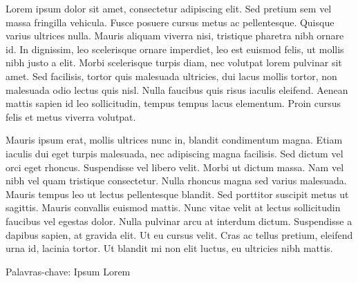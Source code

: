 
Lorem ipsum dolor sit amet, consectetur adipiscing elit. Sed pretium
sem vel massa fringilla vehicula. Fusce posuere cursus metus ac
pellentesque. Quisque varius ultrices nulla. Mauris aliquam viverra
nisi, tristique pharetra nibh ornare id. In dignissim, leo scelerisque
ornare imperdiet, leo est euismod felis, ut mollis nibh justo a elit.
Morbi scelerisque turpis diam, nec volutpat lorem pulvinar sit amet.
Sed facilisis, tortor quis malesuada ultricies, dui lacus mollis
tortor, non malesuada odio lectus quis nisl. Nulla faucibus quis risus
iaculis eleifend. Aenean mattis sapien id leo sollicitudin, tempus
tempus lacus elementum. Proin cursus felis et metus viverra volutpat.

Mauris ipsum erat, mollis ultrices nunc in, blandit condimentum magna.
Etiam iaculis dui eget turpis malesuada, nec adipiscing magna
facilisis. Sed dictum vel orci eget rhoncus. Suspendisse vel libero
velit. Morbi ut dictum massa. Nam vel nibh vel quam tristique
consectetur. Nulla rhoncus magna sed varius malesuada. Mauris tempus
leo ut lectus pellentesque blandit. Sed porttitor suscipit metus ut
sagittis. Mauris convallis euismod mattis. Nunc vitae velit at lectus
sollicitudin faucibus vel egestas dolor. Nulla pulvinar arcu at
interdum dictum. Suspendisse a dapibus sapien, at gravida elit. Ut eu
cursus velit. Cras ac tellus pretium, eleifend urna id, lacinia
tortor. Ut blandit mi non elit luctus, eu ultricies nibh mattis.

Palavras-chave: Ipsum Lorem